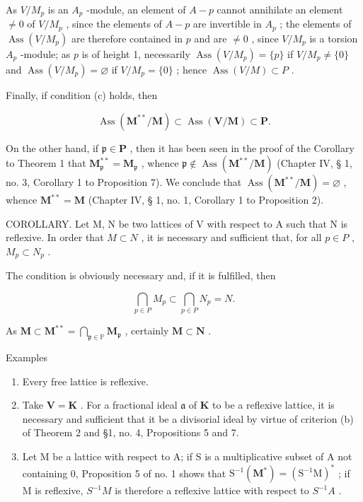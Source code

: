 As \(V / M_{p}\) is an \(A_{p}\) -module, an element of \(A - p\) cannot annihilate an element \(\neq 0\) of \(V / M_{p}\) , since the elements of \(A - p\) are invertible in \(A_{p}\) ; the elements of \(\operatorname{Ass}(V / M_{p})\) are therefore contained in \(p\) and are \(\neq 0\) , since \(V / M_{p}\) is a torsion \(A_{p}\) -module; as \(p\) is of height 1, necessarily \(\operatorname{Ass}(V / M_{p}) = \{p\}\) if \(V / M_{p} \neq \{0\}\) and \(\operatorname{Ass}(V / M_{p}) = \varnothing\) if \(V / M_{p} = \{0\}\) ; hence \(\operatorname{Ass}(V / M) \subset P\) .

Finally, if condition (c) holds, then

\[
\operatorname{Ass} (\mathbf {M} ^ {* *} / \mathbf {M}) \subset \operatorname{Ass} (\mathbf {V} / \mathbf {M}) \subset \mathbf {P}.
\]

On the other hand, if \(\mathfrak{p} \in \mathbf{P}\) , then it has been seen in the proof of the Corollary to Theorem 1 that \(\mathbf{M}_{\mathfrak{p}}^{**} = \mathbf{M}_{\mathfrak{p}}\) , whence \(\mathfrak{p} \notin \operatorname{Ass}(\mathbf{M}^{**}/\mathbf{M})\) (Chapter IV, § 1, no. 3, Corollary 1 to Proposition 7). We conclude that \(\operatorname{Ass}(\mathbf{M}^{**}/\mathbf{M}) = \varnothing\) , whence \(\mathbf{M}^{**} = \mathbf{M}\) (Chapter IV, § 1, no. 1, Corollary 1 to Proposition 2).

COROLLARY. Let M, N be two lattices of V with respect to A such that N is reflexive. In order that \(M \subset N\) , it is necessary and sufficient that, for all \(p \in P\) , \(M_{p} \subset N_{p}\) .

The condition is obviously necessary and, if it is fulfilled, then

\[
\bigcap_ {p \in P} M _ {p} \subset \bigcap_ {p \in P} N _ {p} = N.
\]

As \(\mathbf{M} \subset \mathbf{M}^{**} = \bigcap_{\mathfrak{p} \in \mathbb{P}} \mathbf{M}_{\mathfrak{p}}\) , certainly \(\mathbf{M} \subset \mathbf{N}\) .

Examples

\begin{enumerate}
\def\labelenumi{(\arabic{enumi})}
\item
  Every free lattice is reflexive.
\item
  Take \(\mathbf{V} = \mathbf{K}\) . For a fractional ideal \(\mathfrak{a}\) of \(\mathbf{K}\) to be a reflexive lattice, it is necessary and sufficient that it be a divisorial ideal by virtue of criterion (b) of Theorem 2 and §1, no. 4, Propositions 5 and 7.
\item
  Let M be a lattice with respect to A; if S is a multiplicative subset of A not containing 0, Proposition 5 of no. 1 shows that \(\mathrm{S}^{-1}(\mathbf{M}^{*}) = (\mathrm{S}^{-1}\mathrm{M})^{*}\) ; if M is reflexive, \(S^{-1}M\) is therefore a reflexive lattice with respect to \(S^{-1}A\) .
\end{enumerate}

